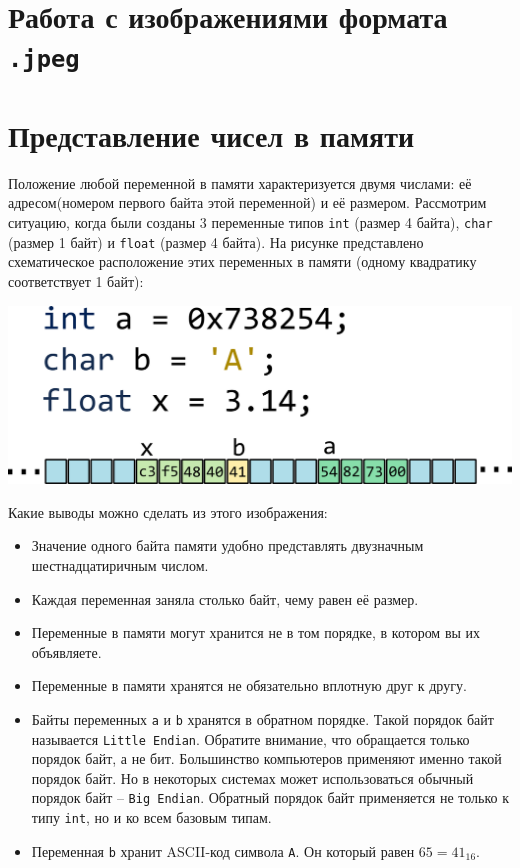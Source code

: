 \documentclass[10pt]{article}
\begin{document}
\newpage
\section*{Работа с изображениями формата \texttt{.jpeg}}



\newpage
\section*{Представление чисел в памяти}
Положение любой переменной в памяти характеризуется двумя числами: её адресом(номером первого байта этой переменной) и её размером. Рассмотрим ситуацию, когда были созданы 3 переменные типов \texttt{int} (размер 4 байта), \texttt{char} (размер 1 байт) и \texttt{float} (размер 4 байта).
На рисунке представлено схематическое расположение этих переменных в памяти (одному квадратику соответствует 1 байт):

\begin{center}
\includegraphics[scale=1]{../images/memory/memory_2_different_types.png}
\end{center}
Какие выводы можно сделать из этого изображения:
\begin{itemize}
\item Значение одного байта памяти удобно представлять двузначным шестнадцатиричным числом.
\item Каждая переменная заняла столько байт, чему равен её размер.
\item Переменные в памяти могут хранится не в том порядке, в котором вы их объявляете.
\item Переменные в памяти хранятся не обязательно вплотную друг к другу.
\item Байты переменных \texttt{a} и \texttt{b} хранятся в обратном порядке. Такой порядок байт называется \texttt{Little Endian}.  Обратите внимание, что обращается только порядок байт, а не бит. Большинство компьютеров применяют именно такой порядок байт. Но в некоторых системах может использоваться обычный порядок байт -- \texttt{Big Endian}. Обратный порядок байт применяется не только к типу \texttt{int}, но и ко всем базовым типам.
\item Переменная \texttt{b} хранит ASCII-код символа \texttt{A}. Он который равен $65 = 41_{16}$.
\end{itemize}
\end{document}

